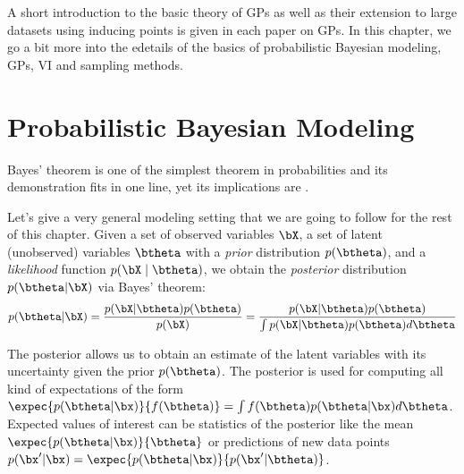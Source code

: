 


\graphicspath{{2_background/figures/}}

A short introduction to the basic theory of \acl{GPs} as well as their extension to large datasets using inducing points \cite{Titsias2009} is given in each paper on \ac{GPs}.
In this chapter, we go a bit more into the edetails of the basics of probabilistic Bayesian modeling, \acl{GPs}, \acl{VI} and sampling methods.


\section{Probabilistic Bayesian Modeling}

\label{sec:prob_bayes}

Bayes' theorem is one of the simplest theorem in probabilities and its demonstration fits in one line, yet its implications are .

Let's give a very general modeling setting that we are going to follow for the rest of this chapter.
Given a set of observed variables $\bX$, a set of latent (unobserved) variables $\btheta$ with a \textit{prior} distribution $p(\btheta)$, and a \textit{likelihood} function $p(\bX\mid\btheta)$, we obtain the \textit{posterior} distribution $p(\btheta|\bX)$ via Bayes' theorem:
\begin{align}
p(\btheta|\bX) = \frac{p(\bX|\btheta)p(\btheta)}{p(\bX)} = \frac{p(\bX|\btheta)p(\btheta)}{\int p(\bX|\btheta)p(\btheta)d\btheta}
\label{eq:bayes}
\end{align}

The posterior allows us to obtain an estimate of the latent variables with its uncertainty given the prior $p(\btheta)$.
The posterior is used for computing all kind of expectations of the form $\expec{p(\btheta|\bx)}{f(\btheta)} = \int f(\btheta)p(\btheta|\bx)d\btheta$.
Expected values of interest can be statistics of the posterior like the mean $\expec{p(\btheta|\bx)}{\btheta}$ or predictions of new data points $p(\bx'|\bx) = \expec{p(\btheta|\bx)}{p(\bx'|\btheta)}$.

